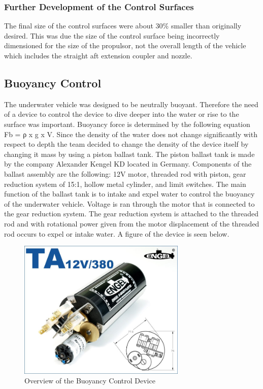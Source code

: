 \documentclass{report}
\begin{document}
\subsubsection{Further Development of the Control Surfaces}
The final size of the control surfaces were about 30\% smaller than originally desired. This was due the size of the control surface being incorrectly dimensioned for the size of the propulsor, not the overall length of the vehicle which includes the straight aft extension coupler and nozzle. 
\subsection{Buoyancy Control}
The underwater vehicle was designed to be neutrally buoyant. Therefore the need of a device to control the device to dive deeper into the water or rise to the surface was important. Buoyancy force is determined by the following equation Fb = ρ x g x V. Since the density of the water does not change significantly with respect to depth the team decided to change the density of the device itself by changing it mass by using a piston ballast tank. The piston ballast tank is made by the company Alexander Kengel KD located in Germany. Components of the ballast assembly are the following: 12V motor, threaded rod with piston, gear reduction system of 15:1, hollow metal cylinder, and limit switches. The main function of the ballast tank is to intake and expel water to control the buoyancy of the underwater vehicle. Voltage is ran through the motor that is connected to the gear reduction system. The gear reduction system is attached to the threaded rod and with rotational power given from the motor displacement of the threaded rod occurs to expel or intake water. A figure of the device is seen below.
\begin{figure}[h]
\centering
\includegraphics[width=8cm]{bcOverview}
\caption{Overview of the Buoyancy Control Device}
\end{figure}
\end{document}
